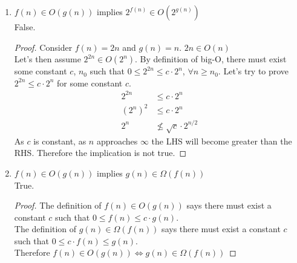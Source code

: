 \documentclass{article}
\begin{document}
\begin{enumerate}
\begin{enumerate}
                    \item $f(n)\in O(g(n))$ implies $2^{f(n)}\in O(2^{g(n)})$\\
                        False.
                        \begin{proof}
                            Consider $f(n) = 2n$ and $g(n) = n$.
                            $2n \in O(n)$\\
                            Let's then assume $2^{2n}\in O(2^{n})$. By definition of big-O, there must exist some constant $c$, $n_0$
                             such that $0\leq 2^{2n}\leq c\cdot 2^n$, $\forall n\geq n_0$. Let's try to prove $2^{2n}\leq c\cdot 2^n$ for some constant $c$.
                            \begin{align*}
                                2^{2n}&\leq c\cdot 2^n\\
                                (2^n)^2&\leq c\cdot 2^n\\
                                2^n&\not\leq \sqrt{c}\cdot 2^{n/2}
                            \end{align*}                      
                            As $c$ is constant, as $n$ approaches $\infty$ the LHS will become greater than the RHS. Therefore the implication is not true.
                        \end{proof}
                    \item $f(n)\in O(g(n))$ implies $g(n)\in\Omega(f(n))$\\
                        True.
                        \begin{proof}
                            The definition of $f(n)\in O(g(n))$ says there must exist a constant $c$ such that $0\leq f(n)\leq c\cdot g(n)$.\\
                            The definition of $g(n)\in\Omega(f(n))$ says there must exist a constant $c$ such that $0\leq c\cdot f(n)\leq g(n)$.\\
                            Therefore $f(n)\in O(g(n)) \Leftrightarrow g(n)\in\Omega(f(n))$


\end{proof}
\end{enumerate}
\end{enumerate}
\end{document}
